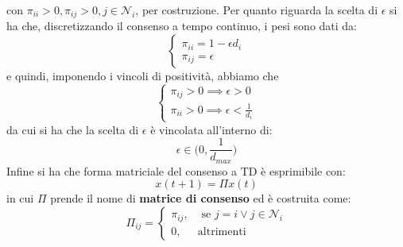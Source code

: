 con $\pi_{ii} >0, \pi_{ij} > 0, j \in \mathcal{N}_i$, per costruzione.
Per quanto riguarda la scelta di $\epsilon$ si ha che, discretizzando il consenso a tempo continuo, i pesi sono dati da:
\begin{equation}
\begin{cases}
\pi_{ii} = 1 - \epsilon d_i \\
\pi_{ij} = \epsilon 
\end{cases}
\end{equation} e quindi, imponendo i vincoli di positivit\`a, abbiamo che
\begin{equation}
\begin{cases}
\pi_{ij} > 0 \implies \epsilon > 0  \\
\pi_{ii} > 0 \implies \epsilon < \frac{1}{d_i}
\end{cases}
\end{equation} da cui si ha che la scelta di $\epsilon$ \`e vincolata all'interno di: 
\begin{equation}
\epsilon \in \Big ( 0, \frac{1}{d_{max}} \Big )
\end{equation} Infine si ha che forma matriciale del consenso a TD \`e esprimibile con:
\begin{equation}
x(t+1) = \Pi x(t)
\end{equation} in cui $\Pi$ prende il nome di \textbf{matrice di consenso} ed \`e costruita come:
\begin{equation}
\Pi_{ij} = \begin{cases}
\pi_{ij}, & \text{ se } j=i \lor j \in \mathcal{N}_i \\
0, & \text{altrimenti }
\end{cases}
\end{equation}

